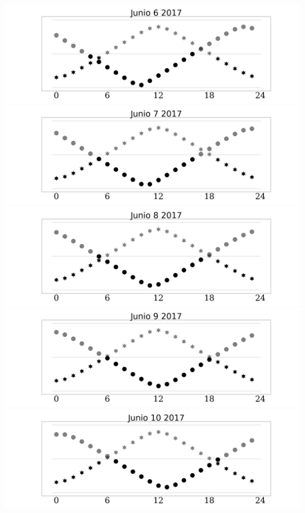 \documentclass{report}
\begin{document}
\includegraphics[width=1.00\textwidth]{Junio_6_2017.png}\newpage
\includegraphics[width=1.00\textwidth]{Junio_7_2017.png}\newpage
\includegraphics[width=1.00\textwidth]{Junio_8_2017.png}\newpage
\includegraphics[width=1.00\textwidth]{Junio_9_2017.png}\newpage
\includegraphics[width=1.00\textwidth]{Junio_10_2017.png}\newpage
\end{document}
